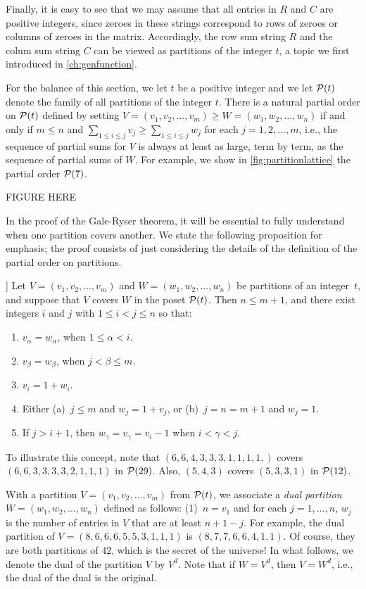 Finally, it is easy to see that we may assume that all entries in 
$R$ and $C$ are positive integers, since zeroes in these strings
correspond to rows of zeroes or columns of zeroes in the matrix.
Accordingly, the row sum string $R$ and the colum sum string $C$ can be
viewed as partitions of the integer $t$, a topic we first introduced
in \autoref{ch:genfunction}.  

For the balance of this section, we let $t$ be a positive integer
and we let $\mathcal{P}(t)$ denote the family of all partitions of the integer
$t$.  There is a natural 
partial order on $\mathcal{P}(t)$ defined by setting $V=(v_1,v_2,\dots,v_m)
\ge W=(w_1,w_2,\dots,w_n)$ if and only if $m\le n$ and $\sum_{1\le i\le j}v_j\ge
\sum_{1\le i\le j}w_j$ for each $j=1,2,\dots,m$, i.e., the sequence 
of partial sums for $V$ is always at least as large, term by term, 
as the sequence of partial sums of $W$.  For example, we show in 
\autoref{fig:partitionlattice} the partial order $\mathcal{P}(7)$.

FIGURE HERE

In the proof of the Gale-Ryser theorem, it will be essential
to fully understand when one partition covers another.  We state
the following proposition for emphasis; the proof consists
of just considering the details of the definition of the partial
order on partitions.

\begin{proposition}]\label{prop:partitioncover}
Let $V=(v_1,v_2,\dots,v_m)$ and $W=(w_1,w_2,\dots,w_n)$
be partitions of an integer~$t$, and suppose that $V$ covers $W$ in
the poset $\mathcal{P}(t)$.  Then $n\le m+1$, and there exist integers $i$ and $j$ with
$1\le i<j\le n$ so that:
\begin{enumerate}
\item $v_\alpha=w_\alpha$, when $1\le \alpha<i$.
\item $v_\beta=w_\beta$, when $j<\beta\le m$.
\item $v_i=1+w_i$.
\item Either (a)~$j\le m$ and $w_j=1+v_j$, or (b)~$j=n=m+1$ and $w_j=1$.
\item If $j>i+1$, then $w_\gamma=v_\gamma=v_i-1$ when $i<\gamma<j$.
\end{enumerate}
\end{proposition}

To illustrate this concept, note that $(6,6,4,3,3,3,1,1,1,1,)$ covers
$(6,6,3,3,3,3,2,1,1,1)$ in $\mathcal{P}(29)$.  Also, $(5,4,3)$ covers $(5,3,3,1)$ in
$\mathcal{P}(12)$.

With a partition $V=(v_1,v_2,\dots,v_m)$ from $\mathcal{P}(t)$,
we associate a \textit{dual partition} $W=(w_1,w_2,\dots,w_n)$ defined
as follows:  (1)~$n=v_1$ and for each $j=1,\dots,n$, $w_j$ is the
number of entries in $V$ that are at least $n+1-j$.  For example, the dual 
partition of $V=(8,6,6,6,5,5,3,1,1,1)$ is $(8,7,7,6,6,4,1,1)$.
Of course, they are both partitions of $42$, which is the secret
of the universe!  In what follows, we denote the dual of the partition 
$V$ by $V^d$.  Note that if $W=V^d$, then $V=W^d$, i.e., the dual of the 
dual is the original.

